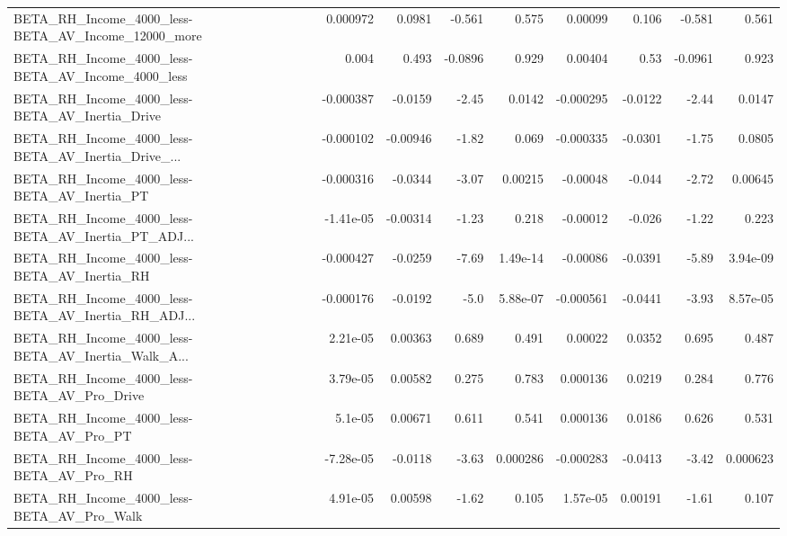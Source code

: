 \begin{tabular}{lrrrrrrrr}
BETA\_RH\_Income\_4000\_less-BETA\_AV\_Income\_12000\_more &    0.000972 &       0.0981 &   -0.561 &    0.575 &    0.00099 &       0.106 &       -0.581 &         0.561 \\
BETA\_RH\_Income\_4000\_less-BETA\_AV\_Income\_4000\_less  &       0.004 &        0.493 &  -0.0896 &    0.929 &    0.00404 &        0.53 &      -0.0961 &         0.923 \\
BETA\_RH\_Income\_4000\_less-BETA\_AV\_Inertia\_Drive     &   -0.000387 &      -0.0159 &    -2.45 &   0.0142 &  -0.000295 &     -0.0122 &        -2.44 &        0.0147 \\
BETA\_RH\_Income\_4000\_less-BETA\_AV\_Inertia\_Drive\_... &   -0.000102 &     -0.00946 &    -1.82 &    0.069 &  -0.000335 &     -0.0301 &        -1.75 &        0.0805 \\
BETA\_RH\_Income\_4000\_less-BETA\_AV\_Inertia\_PT        &   -0.000316 &      -0.0344 &    -3.07 &  0.00215 &   -0.00048 &      -0.044 &        -2.72 &       0.00645 \\
BETA\_RH\_Income\_4000\_less-BETA\_AV\_Inertia\_PT\_ADJ... &   -1.41e-05 &     -0.00314 &    -1.23 &    0.218 &   -0.00012 &      -0.026 &        -1.22 &         0.223 \\
BETA\_RH\_Income\_4000\_less-BETA\_AV\_Inertia\_RH        &   -0.000427 &      -0.0259 &    -7.69 & 1.49e-14 &   -0.00086 &     -0.0391 &        -5.89 &      3.94e-09 \\
BETA\_RH\_Income\_4000\_less-BETA\_AV\_Inertia\_RH\_ADJ... &   -0.000176 &      -0.0192 &     -5.0 & 5.88e-07 &  -0.000561 &     -0.0441 &        -3.93 &      8.57e-05 \\
BETA\_RH\_Income\_4000\_less-BETA\_AV\_Inertia\_Walk\_A... &    2.21e-05 &      0.00363 &    0.689 &    0.491 &    0.00022 &      0.0352 &        0.695 &         0.487 \\
BETA\_RH\_Income\_4000\_less-BETA\_AV\_Pro\_Drive         &    3.79e-05 &      0.00582 &    0.275 &    0.783 &   0.000136 &      0.0219 &        0.284 &         0.776 \\
BETA\_RH\_Income\_4000\_less-BETA\_AV\_Pro\_PT            &     5.1e-05 &      0.00671 &    0.611 &    0.541 &   0.000136 &      0.0186 &        0.626 &         0.531 \\
BETA\_RH\_Income\_4000\_less-BETA\_AV\_Pro\_RH            &   -7.28e-05 &      -0.0118 &    -3.63 & 0.000286 &  -0.000283 &     -0.0413 &        -3.42 &      0.000623 \\
BETA\_RH\_Income\_4000\_less-BETA\_AV\_Pro\_Walk          &    4.91e-05 &      0.00598 &    -1.62 &    0.105 &   1.57e-05 &     0.00191 &        -1.61 &         0.107 \\

\end{tabular}
